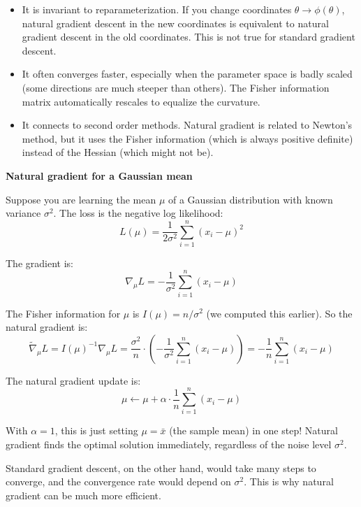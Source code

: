 \begin{itemize}
\item It is invariant to reparameterization. If you change coordinates $\theta \to \phi(\theta)$, natural gradient descent in the new coordinates is equivalent to natural gradient descent in the old coordinates. This is not true for standard gradient descent.

\item It often converges faster, especially when the parameter space is badly scaled (some directions are much steeper than others). The Fisher information matrix automatically rescales to equalize the curvature.

\item It connects to second order methods. Natural gradient is related to Newton's method, but it uses the Fisher information (which is always positive definite) instead of the Hessian (which might not be).
\end{itemize}

\vspace{1.5em}

\begin{examplebox}
\textbf{Natural gradient for a Gaussian mean}

\vspace{0.5em}

Suppose you are learning the mean $\mu$ of a Gaussian distribution with known variance $\sigma^2$. The loss is the negative log likelihood:
\begin{equation*}
L(\mu) = \frac{1}{2\sigma^2} \sum_{i=1}^n (x_i - \mu)^2
\end{equation*}

The gradient is:
\begin{equation*}
\nabla_\mu L = -\frac{1}{\sigma^2} \sum_{i=1}^n (x_i - \mu)
\end{equation*}

The Fisher information for $\mu$ is $I(\mu) = n / \sigma^2$ (we computed this earlier). So the natural gradient is:
\begin{equation*}
\tilde{\nabla}_\mu L = I(\mu)^{-1} \nabla_\mu L = \frac{\sigma^2}{n} \cdot \left(-\frac{1}{\sigma^2} \sum_{i=1}^n (x_i - \mu)\right) = -\frac{1}{n} \sum_{i=1}^n (x_i - \mu)
\end{equation*}

The natural gradient update is:
\begin{equation*}
\mu \leftarrow \mu + \alpha \cdot \frac{1}{n} \sum_{i=1}^n (x_i - \mu)
\end{equation*}

With $\alpha = 1$, this is just setting $\mu = \bar{x}$ (the sample mean) in one step! Natural gradient finds the optimal solution immediately, regardless of the noise level $\sigma^2$.

\vspace{0.5em}

Standard gradient descent, on the other hand, would take many steps to converge, and the convergence rate would depend on $\sigma^2$. This is why natural gradient can be much more efficient.
\end{examplebox}

